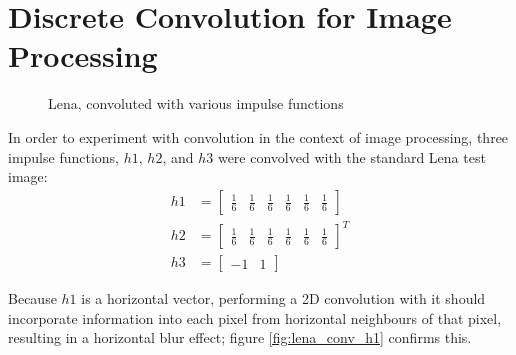 \documentclass{sydeStyle}
\begin{document}



\section*{Discrete Convolution for Image Processing}
 \begin{figure}
	\begin{center}
	\end{center}
	\caption{Lena, convoluted with various impulse functions}
	\label{SummingAmp2}
\end{figure}
In order to experiment with convolution in the context of image processing,
three impulse functions, $h1$, $h2$, and $h3$ were convolved with the standard
Lena test image:
\begin{align*}
	h1 & = \begin{bmatrix}\frac{1}{6} & \frac{1}{6} & \frac{1}{6} & \frac{1}{6}
		& \frac{1}{6} & \frac{1}{6}\end{bmatrix} \\
	h2 & = \begin{bmatrix}\frac{1}{6} & \frac{1}{6} & \frac{1}{6} & \frac{1}{6}
		& \frac{1}{6} & \frac{1}{6}\end{bmatrix}^T \\
	h3 & = \begin{bmatrix}-1 & 1\end{bmatrix}
\end{align*}

Because $h1$ is a horizontal vector, performing a 2D convolution with it should
incorporate information into each pixel from horizontal neighbours of that pixel,
resulting in a horizontal blur effect; figure \ref{fig:lena_conv_h1} confirms this.
\end{document}
